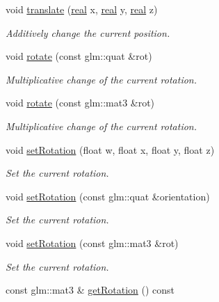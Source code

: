 \begin{DoxyCompactItemize}
void \mbox{\hyperlink{classr3_1_1_transform3_d_aab83077fb0b382391493aa59bdd2ce13}{translate}} (\mbox{\hyperlink{namespacer3_ab2016b3e3f743fb735afce242f0dc1eb}{real}} x, \mbox{\hyperlink{namespacer3_ab2016b3e3f743fb735afce242f0dc1eb}{real}} y, \mbox{\hyperlink{namespacer3_ab2016b3e3f743fb735afce242f0dc1eb}{real}} z)
\begin{DoxyCompactList}\small\item\em Additively change the current position. \end{DoxyCompactList}\item 
void \mbox{\hyperlink{classr3_1_1_transform3_d_aaf633209948d35ca4b90422614a84478}{rotate}} (const glm\+::quat \&rot)
\begin{DoxyCompactList}\small\item\em Multiplicative change of the current rotation. \end{DoxyCompactList}\item 
void \mbox{\hyperlink{classr3_1_1_transform3_d_a802314a0dee26e4a5fb96666cd39741c}{rotate}} (const glm\+::mat3 \&rot)
\begin{DoxyCompactList}\small\item\em Multiplicative change of the current rotation. \end{DoxyCompactList}\item 
void \mbox{\hyperlink{classr3_1_1_transform3_d_a78c34c186d255ad6dcd0adf7ce199c4e}{set\+Rotation}} (float w, float x, float y, float z)
\begin{DoxyCompactList}\small\item\em Set the current rotation. \end{DoxyCompactList}\item 
void \mbox{\hyperlink{classr3_1_1_transform3_d_af539b9a5a73f5196515f9a55ee73be4d}{set\+Rotation}} (const glm\+::quat \&orientation)
\begin{DoxyCompactList}\small\item\em Set the current rotation. \end{DoxyCompactList}\item 
void \mbox{\hyperlink{classr3_1_1_transform3_d_acaab6048f44805ef28fdae452f0c4853}{set\+Rotation}} (const glm\+::mat3 \&rot)
\begin{DoxyCompactList}\small\item\em Set the current rotation. \end{DoxyCompactList}\item 
const glm\+::mat3 \& \mbox{\hyperlink{classr3_1_1_transform3_d_a1bad817e81d93f275ac71864fae763aa}{get\+Rotation}} () const

\end{DoxyCompactItemize}
